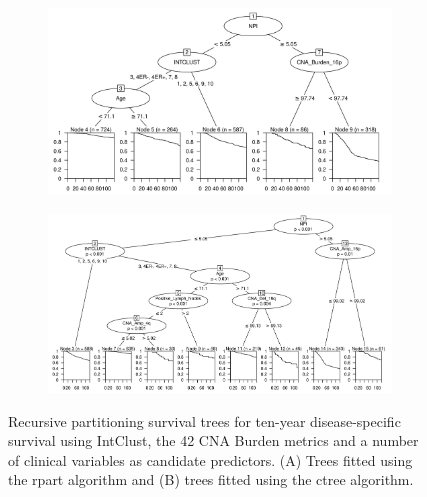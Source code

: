 \begin{figure}[!h]
\centering

\vspace{1cm}

\begin{subfigure}{\textwidth}
\subcaption{}
\includegraphics[width=1\textwidth]{../figures/Chapter_3/Clin_PA_PartyKit_Survival_Burden_TenYearDSS_INTCLUST.png}
\end{subfigure}

\vspace{2cm}

\begin{subfigure}{\textwidth}
\subcaption{}
\includegraphics[width=1\textwidth]{../figures/Chapter_3/Clin_PA_Ctree_Survival_Burden_TenYearDSS_INTCLUST.png}
\end{subfigure}

\vspace{1cm}

\caption[Recursive partitioning survival trees for ten-year disease-specific survival using IntClust, the 42 CNA Burden metrics and a number of clinical variables as candidate predictors.]{Recursive partitioning survival trees for ten-year disease-specific survival using IntClust, the 42 CNA Burden metrics and a number of clinical variables as candidate predictors. (A) Trees fitted using the rpart algorithm and (B) trees fitted using the ctree algorithm.}
\label{fig:PA_INTCLUST_CNA_Burden_TenYearDSS_Clin}
\end{figure}

